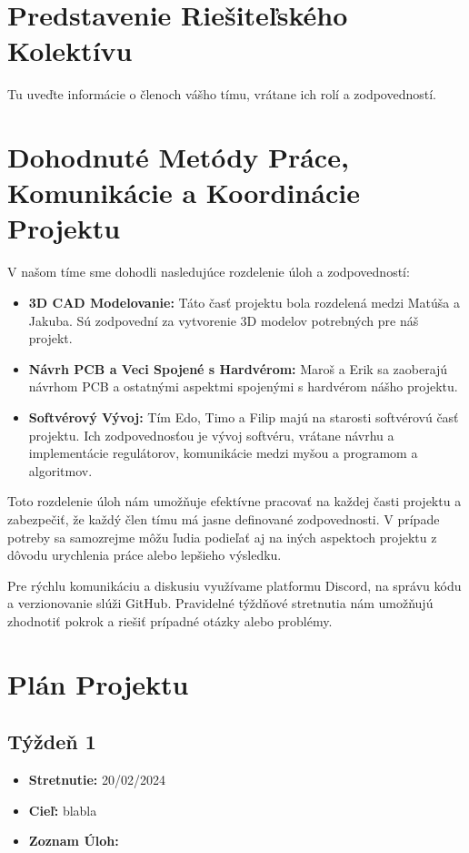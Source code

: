 \section{Predstavenie Riešiteľského Kolektívu}

Tu uveďte informácie o členoch vášho tímu, vrátane ich rolí a zodpovedností.

\section{Dohodnuté Metódy Práce, Komunikácie a Koordinácie Projektu}
V našom tíme sme dohodli nasledujúce rozdelenie úloh a zodpovedností:

\begin{itemize}
    \item \textbf{3D CAD Modelovanie:} Táto časť projektu bola rozdelená medzi Matúša a Jakuba. Sú zodpovední za vytvorenie 3D modelov potrebných pre náš projekt.
    
    \item \textbf{Návrh PCB a Veci Spojené s Hardvérom:} Maroš a Erik sa zaoberajú návrhom PCB a ostatnými aspektmi spojenými s hardvérom nášho projektu.
    
    \item \textbf{Softvérový Vývoj:} Tím Edo, Timo a Filip majú na starosti softvérovú časť projektu. Ich zodpovednosťou je vývoj softvéru, vrátane návrhu a implementácie regulátorov, komunikácie medzi myšou a programom a algoritmov.
\end{itemize}

Toto rozdelenie úloh nám umožňuje efektívne pracovať na každej časti projektu a zabezpečiť, že každý člen tímu má jasne definované zodpovednosti. V prípade potreby sa samozrejme môžu ľudia podieľať aj na iných aspektoch projektu z dôvodu urychlenia práce alebo lepšieho výsledku. 

Pre rýchlu komunikáciu a diskusiu využívame platformu Discord, na správu kódu a verzionovanie slúži GitHub. Pravidelné týždňové stretnutia nám umožňujú zhodnotiť pokrok a riešiť prípadné otázky alebo problémy.

\section{Plán Projektu}

\subsection{Týždeň 1}
\begin{itemize}
    \item \textbf{Stretnutie:} 20/02/2024
    \item \textbf{Cieľ: } blabla
    \item \textbf{Zoznam Úloh:}
\end{itemize}

